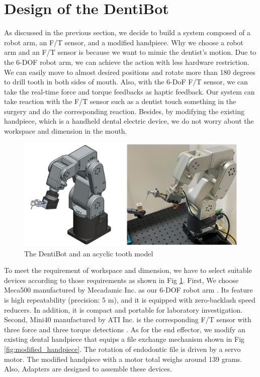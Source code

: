 \section{Design of the DentiBot}
\hspace*{6mm}As discussed in the previous section, we decide to build a system composed of a robot arm, an F/T sensor, and a modified handpiece. Why we choose a robot arm and an F/T sensor is because we want to mimic the dentist's motion. Due to the 6-DOF robot arm, we can achieve the action with less hardware restriction. We can easily move to almost desired positions and rotate more than 180 degrees to drill tooth in both sides of mouth. Also, with the 6-DoF F/T sensor, we can take the real-time force and torque feedbacks as haptic feedback. Our system can take reaction with the F/T sensor such as a dentist touch something in the surgery and do the corresponding reaction. Besides, by modifying the existing handpiece, which is a handheld dental electric device, we do not worry about the workspace and dimension in the mouth.		
\par
\begin{figure}[H]
\begin{center}
\includegraphics[width=1\linewidth]{Images/DentiBot.png}
\caption{
The DentiBot and an acyclic tooth model
}\label{fig:DentiBot}
\end{center}
\end{figure}	
To meet the requirement of workspace and dimension, we have to select suitable devices according to those requirements as shown in Fig \ref{fig:DentiBot}. First, We choose Meca500 manufactured by Mecadamic Inc. as our 6-DOF robot arm  \cite{web4} . Its feature is high repeatability (precision: 5 \textmu m), and it is equipped with zero-backlash speed reducers. In addition, it is compact and portable for laboratory investigation. Second, Mini40 manufactured by ATI Inc. is the corresponding F/T sensor with three force and three torque detections \cite{web5}. As for the end effector, we modify an existing dental handpiece that equips a file exchange mechanism shown in Fig \ref{fig:modified_handpiece}. The rotation of endodontic file   is driven by a servo motor. The modified handpiece with a motor total weighs around 139 grams.  Also, Adapters are designed to assemble these devices.

